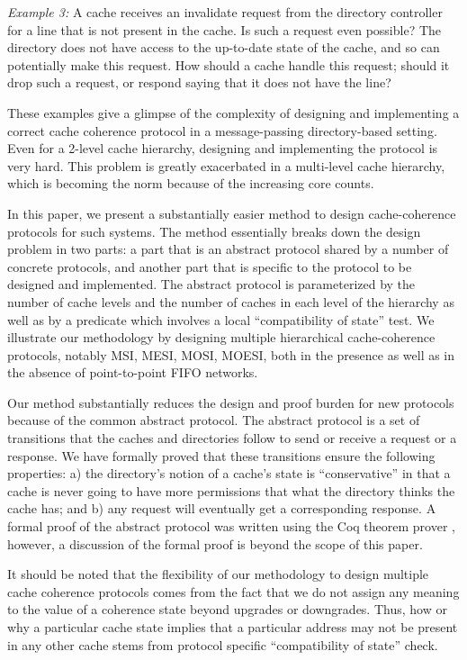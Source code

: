 \emph{Example 3:} A cache receives an invalidate request from the directory
controller for a line that is not present in the cache. Is such a request even
possible? The directory does not have access to the up-to-date state of the
cache, and so can potentially make this request. How should a cache handle this
request; should it drop such a request, or respond saying that it does not have
the line?

These examples give a glimpse of the complexity of designing and implementing a
correct cache coherence protocol in a message-passing directory-based setting.
Even for a 2-level cache hierarchy, designing and implementing the protocol is
very hard. This problem is greatly exacerbated in a multi-level cache
hierarchy, which is becoming the norm because of the increasing core counts. 

In this paper, we present a substantially easier method to design
cache-coherence protocols for such systems. The method essentially breaks down
the design problem in two parts: a part that is an abstract protocol shared by
a number of concrete protocols, and another part that is specific to the
protocol to be designed and implemented. The abstract protocol is parameterized
by the number of cache levels and the number of caches in each level of the
hierarchy as well as by a predicate which involves a local ``compatibility of
state'' test. We illustrate our methodology by designing multiple
hierarchical cache-coherence protocols, notably MSI, MESI, MOSI, MOESI, both in
the presence as well as in the absence of point-to-point FIFO networks.

Our method substantially reduces the design and proof burden for new protocols
because of the common abstract protocol. The abstract protocol is a set of
transitions that the caches and directories follow to send or receive a request
or a response. We have formally proved that these transitions ensure the
following properties: a) the directory's notion of a cache's state is
``conservative'' in that a cache is never going to have more permissions that
what the directory thinks the cache has; and b) any request will eventually get
a corresponding response. A formal proof of the abstract protocol was written
using the Coq theorem prover \cite{}, however, a discussion of the formal proof
is beyond the scope of this paper.

It should be noted that the flexibility of our methodology to design multiple
cache coherence protocols comes from the fact that we do not assign any meaning
to the value of a coherence state beyond upgrades or downgrades. Thus, how or
why a particular cache state implies that a particular address may not be
present in any other cache stems from protocol specific ``compatibility of
state'' check. 

